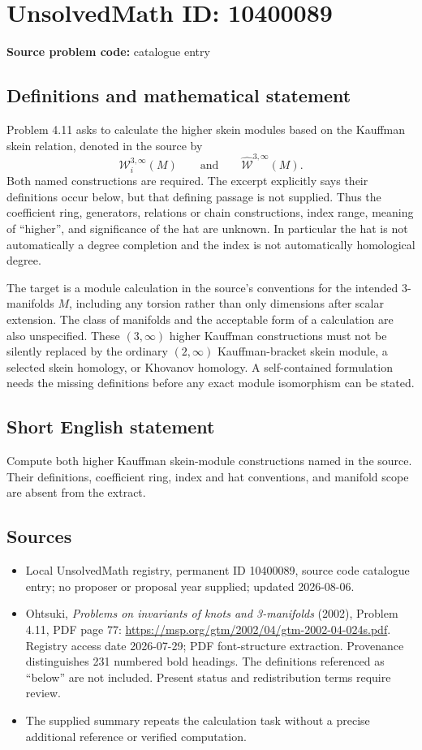 \documentclass[11pt]{article}
\begin{document}
\section*{UnsolvedMath ID: 10400089}
\textbf{Source problem code:} catalogue entry
\subsection{Definitions and mathematical statement}
Problem 4.11 asks to calculate the higher skein modules based on the Kauffman skein relation, denoted in the source by
\[
 \mathcal W_i^{3,\infty}(M)\qquad\text{and}\qquad
 \widehat{\mathcal W}^{3,\infty}(M).
\]
Both named constructions are required. The excerpt explicitly says their definitions occur below, but that defining passage is not supplied. Thus the coefficient ring, generators, relations or chain constructions, index range, meaning of ``higher'', and significance of the hat are unknown. In particular the hat is not automatically a degree completion and the index is not automatically homological degree.

The target is a module calculation in the source's conventions for the intended 3-manifolds \(M\), including any torsion rather than only dimensions after scalar extension. The class of manifolds and the acceptable form of a calculation are also unspecified. These \((3,\infty)\) higher Kauffman constructions must not be silently replaced by the ordinary \((2,\infty)\) Kauffman-bracket skein module, a selected skein homology, or Khovanov homology. A self-contained formulation needs the missing definitions before any exact module isomorphism can be stated.
\subsection{Short English statement}
Compute both higher Kauffman skein-module constructions named in the source. Their definitions, coefficient ring, index and hat conventions, and manifold scope are absent from the extract.
\subsection{Sources}
\begin{itemize}
\item Local UnsolvedMath registry, permanent ID 10400089, source code catalogue entry; no proposer or proposal year supplied; updated 2026-08-06.
\item Ohtsuki, \emph{Problems on invariants of knots and 3-manifolds} (2002), Problem 4.11, PDF page 77: \url{https://msp.org/gtm/2002/04/gtm-2002-04-024s.pdf}. Registry access date 2026-07-29; PDF font-structure extraction. Provenance distinguishes 231 numbered bold headings. The definitions referenced as ``below'' are not included. Present status and redistribution terms require review.
\item The supplied summary repeats the calculation task without a precise additional reference or verified computation.
\end{itemize}
\end{document}
